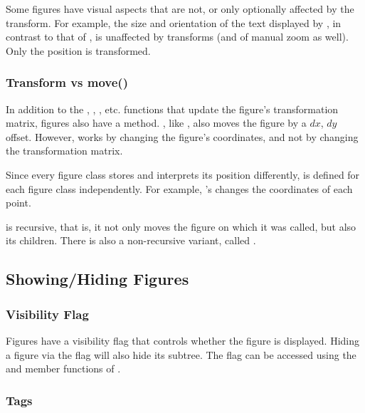Some figures have visual aspects that are not, or only optionally affected
by the transform. For example, the size and orientation of the text
displayed by , in contrast to that of
, is unaffected by transforms (and of manual zoom as
well). Only the position is transformed.

\subsubsection{Transform vs move()}
\label{sec:graphics:figure-transform-vs-move}

In addition to the , , ,
etc. functions that update the figure's transformation matrix, figures also
have a  method. , like ,
also moves the figure by a $dx$, $dy$ offset. However,  works
by changing the figure's coordinates, and not by changing the
transformation matrix.

Since every figure class stores and interprets its position differently,
 is defined for each figure class independently. For example,
's  changes the coordinates of each point.

 is recursive, that is, it not only moves the figure on which
it was called, but also its children. There is also a non-recursive variant,
called .


\subsection{Showing/Hiding Figures}
\label{sec:graphics:showing-hiding-figures}

\subsubsection{Visibility Flag}
\label{sec:graphics:figure-visibility-flag}

Figures have a visibility flag that controls whether the figure is displayed.
Hiding a figure via the flag will also hide its subtree. The flag can be
accessed using the  and  member functions
of .

\subsubsection{Tags}
\label{sec:graphics:figure-tags}

